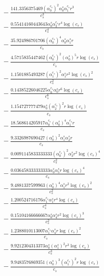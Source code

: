 \documentclass[10pt]{article}
\begin{document}
\begin{align*}
&{}  - \frac{141.3356375469 \left(\alpha_{0}^{c_s}\right)^{2} \alpha_{0}^s \alpha_{1}^{c_s} r^{3}}{c_{s}^{3}} \\
&{}  - \frac{0.55414160443643 \alpha_{0}^s \alpha_{2}^{c_s} r^{4} \log{\left(c_{s} \right)}}{c_{s}^{4}} \\
&{}  - \frac{35.924986701706 \left(\alpha_{0}^{c_s}\right)^{4} \alpha_{0}^s \alpha_{1}^s r}{c_{s}} \\
&{}  - \frac{4.5715835447462 \left(\alpha_{0}^{c_s}\right)^{2} \left(\alpha_{0}^s\right)^{5} r \log{\left(c_{s} \right)}}{c_{s}} \\
&{}  - \frac{1.1501885493287 \left(\alpha_{1}^{c_s}\right)^{2} \alpha_{1}^s r^{2} \log{\left(c_{s} \right)}^{2}}{c_{s}^{2}} \\
&{}  - \frac{0.14385226046225 \alpha_{0}^{c_s} \alpha_{0}^s r^{6} \log{\left(c_{s} \right)}}{c_{s}^{6}} \\
&{}  - \frac{1.154727777479 \alpha_{0}^s \left(\alpha_{2}^{c_s}\right)^{2} r \log{\left(c_{s} \right)}}{c_{s}} \\
&{}  - \frac{18.568614205917 \alpha_{0}^{c_s} \left(\alpha_{0}^s\right)^{4} \alpha_{1}^{c_s} r}{c_{s}} \\
&{}  - \frac{9.3326987690427 \left(\alpha_{0}^s\right)^{2} \alpha_{1}^s \alpha_{2}^s r}{c_{s}} \\
&{}  - \frac{0.0091145833333333 \left(\alpha_{0}^{c_s}\right)^{2} \alpha_{3}^s r^{2} \log{\left(c_{s} \right)}^{4}}{c_{s}^{2}} \\
&{}  - \frac{0.036458333333333 \alpha_{0}^s \alpha_{5}^s r \log{\left(c_{s} \right)}^{4}}{c_{s}} \\
&{}  - \frac{9.4881337599963 \left(\alpha_{0}^s\right)^{4} \alpha_{1}^s r^{2} \log{\left(c_{s} \right)}^{2}}{c_{s}^{2}} \\
&{}  - \frac{1.200524716176 \alpha_{1}^{c_s} \alpha_{1}^s r^{4} \log{\left(c_{s} \right)}}{c_{s}^{4}} \\
&{}  - \frac{0.15104166666667 \alpha_{0}^s \alpha_{4}^s r^{2} \log{\left(c_{s} \right)}^{3}}{c_{s}^{2}} \\
&{}  - \frac{1.2388010113007 \alpha_{1}^{c_s} \alpha_{4}^s r \log{\left(c_{s} \right)}^{2}}{c_{s}} \\
&{}  - \frac{9.9212304313373 \alpha_{0}^s \left(\alpha_{1}^s\right)^{2} r^{3} \log{\left(c_{s} \right)}}{c_{s}^{3}} \\
&{}  - \frac{9.9483576869351 \left(\alpha_{0}^s\right)^{3} \left(\alpha_{1}^{c_s}\right)^{2} r \log{\left(c_{s} \right)}}{c_{s}} \\

\end{align*}
\end{document}
